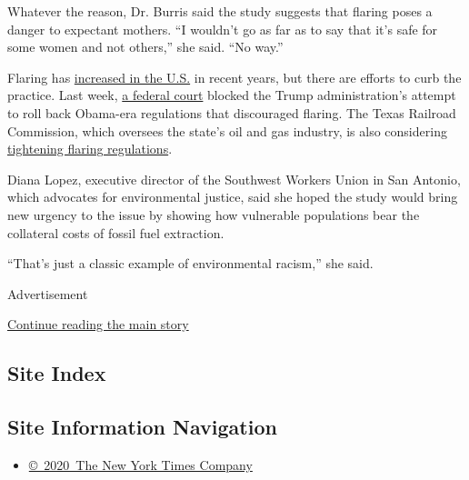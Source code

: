 Whatever the reason, Dr. Burris said the study suggests that flaring
poses a danger to expectant mothers. ``I wouldn't go as far as to say
that it's safe for some women and not others,'' she said. ``No way.''

Flaring has
\href{https://www.worldbank.org/en/news/press-release/2019/06/12/increased-shale-oil-production-and-political-conflict-contribute-to-increase-in-global-gas-flaring}{increased
in the U.S.} in recent years, but there are efforts to curb the
practice. Last week,
\href{https://www.nytimes3xbfgragh.onion/reuters/2020/07/16/us/16reuters-usa-methane-judge.html}{a
federal court} blocked the Trump administration's attempt to roll back
Obama-era regulations that discouraged flaring. The Texas Railroad
Commission, which oversees the state's oil and gas industry, is also
considering
\href{https://www.reuters.com/article/us-climate-change-flaring-idUSKBN23N3BQ}{tightening
flaring regulations}.

Diana Lopez, executive director of the Southwest Workers Union in San
Antonio, which advocates for environmental justice, said she hoped the
study would bring new urgency to the issue by showing how vulnerable
populations bear the collateral costs of fossil fuel extraction.

``That's just a classic example of environmental racism,'' she said.

Advertisement

\protect\hyperlink{after-bottom}{Continue reading the main story}

\hypertarget{site-index}{%
\subsection{Site Index}\label{site-index}}

\hypertarget{site-information-navigation}{%
\subsection{Site Information
Navigation}\label{site-information-navigation}}

\begin{itemize}
\tightlist
\item
  \href{https://help.nytimes3xbfgragh.onion/hc/en-us/articles/115014792127-Copyright-notice}{©~2020~The
  New York Times Company}
\end{itemize}


